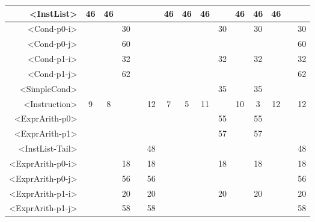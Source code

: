 \begin{tabular}{r|c@{ }c@{ }c@{ }c@{ }c@{ }c@{ }c@{ }c@{ }c@{ }c@{ }c@{ }c@{ }c@{ }c@{ }}
<InstList> & 46 & 46 &   &   &   & 46 & 46 & 46 &   & 46 & 46 & 46 &   &   \\\hline
<Cond-p0-i> &   &   & 30 &   &   &   &   &   & 30 &   & 30 &   &   & 30 \\\hline
<Cond-p0-j> &   &   & 60 &   &   &   &   &   &   &   &   &   &   & 60 \\\hline
<Cond-p1-i> &   &   & 32 &   &   &   &   &   & 32 &   & 32 &   &   & 32 \\\hline
<Cond-p1-j> &   &   & 62 &   &   &   &   &   &   &   &   &   &   & 62 \\\hline
<SimpleCond> &   &   &   &   &   &   &   &   & 35 &   & 35 &   &   &   \\\hline
<Instruction> & 9 & 8 &   &   & 12 & 7 & 5 & 11 &   & 10 & 3 & 12 &   & 12 \\\hline
<ExprArith-p0> &   &   &   &   &   &   &   &   & 55 &   & 55 &   &   &   \\\hline
<ExprArith-p1> &   &   &   &   &   &   &   &   & 57 &   & 57 &   &   &   \\\hline
<InstList-Tail> &   &   &   &   & 48 &   &   &   &   &   &   &   &   & 48 \\\hline
<ExprArith-p0-i> &   &   & 18 &   & 18 &   &   &   & 18 &   & 18 &   &   & 18 \\\hline
<ExprArith-p0-j> &   &   & 56 &   & 56 &   &   &   &   &   &   &   &   & 56 \\\hline
<ExprArith-p1-i> &   &   & 20 &   & 20 &   &   &   & 20 &   & 20 &   &   & 20 \\\hline
<ExprArith-p1-j> &   &   & 58 &   & 58 &   &   &   &   &   &   &   &   & 58 \\\hline
\end{tabular}



